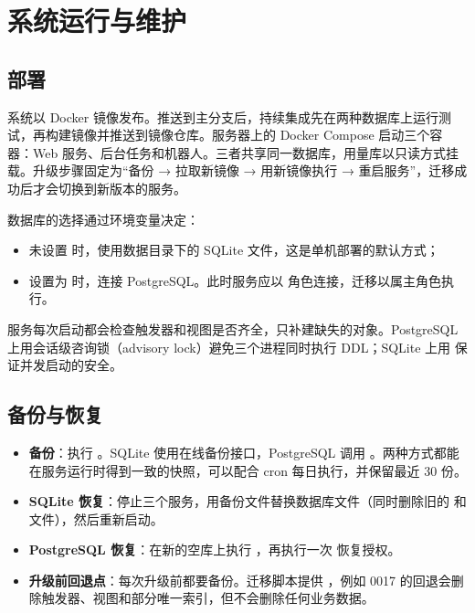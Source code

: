 \section{系统运行与维护}

\subsection{部署}

系统以 Docker 镜像发布。推送到主分支后，持续集成先在两种数据库上运行测试，再构建镜像并推送到镜像仓库。服务器上的 Docker Compose 启动三个容器：Web 服务、后台任务和机器人。三者共享同一数据库，用量库以只读方式挂载。升级步骤固定为“备份 → 拉取新镜像 → 用新镜像执行  → 重启服务”，迁移成功后才会切换到新版本的服务。

数据库的选择通过环境变量决定：
\begin{itemize}
  \item 未设置  时，使用数据目录下的 SQLite 文件，这是单机部署的默认方式；
  \item 设置为  时，连接 PostgreSQL。此时服务应以  角色连接，迁移以属主角色执行。
\end{itemize}
服务每次启动都会检查触发器和视图是否齐全，只补建缺失的对象。PostgreSQL 上用会话级咨询锁（advisory lock）避免三个进程同时执行 DDL；SQLite 上用  保证并发启动的安全。

\subsection{备份与恢复}

\begin{itemize}
  \item \textbf{备份}：执行 。SQLite 使用在线备份接口，PostgreSQL 调用 。两种方式都能在服务运行时得到一致的快照，可以配合 cron 每日执行，并保留最近 30 份。
  \item \textbf{SQLite 恢复}：停止三个服务，用备份文件替换数据库文件（同时删除旧的  和  文件），然后重新启动。
  \item \textbf{PostgreSQL 恢复}：在新的空库上执行 ，再执行一次  恢复授权。
  \item \textbf{升级前回退点}：每次升级前都要备份。迁移脚本提供 ，例如 0017 的回退会删除触发器、视图和部分唯一索引，但不会删除任何业务数据。
\end{itemize}

